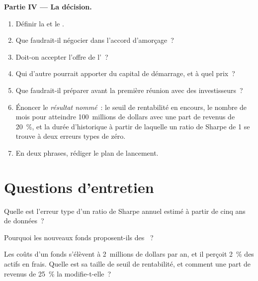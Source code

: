 \begin{problem}
\medskip\noindent\textbf{Partie IV --- La décision.}
\begin{enumerate}[resume]
\item Définir la  et le .
\item Que faudrait-il négocier dans l'accord d'amorçage~?
\item Doit-on accepter l'offre de l'~?
\item Qui d'autre pourrait apporter du capital de démarrage, et à quel prix~?
\item Que faudrait-il préparer avant la première réunion avec des investisseurs~?
\item Énoncer le \emph{résultat nommé}~: le seuil de rentabilité en encours, le nombre de mois pour atteindre 100~millions de dollars avec une part de revenus de 20~\%, et la
durée d'historique à partir de laquelle un ratio de Sharpe de 1 se trouve à deux erreurs types de zéro.
\item En deux phrases, rédiger le plan de lancement.
\end{enumerate}
\end{problem}

\section{Questions d'entretien}

\begin{interviewq}\label{iq:fm:launching-a-fund-and-raising-capital:1}
Quelle est l'erreur type d'un ratio de Sharpe annuel estimé à partir de cinq ans de données~?
\end{interviewq}

\begin{interviewq}\label{iq:fm:launching-a-fund-and-raising-capital:2}
Pourquoi les nouveaux fonds proposent-ils des ~?
\end{interviewq}

\begin{interviewq}\label{iq:fm:launching-a-fund-and-raising-capital:3}
Les coûts d'un fonds s'élèvent à 2~millions de dollars par an, et il perçoit 2~\% des actifs en frais. Quelle est sa taille de seuil de rentabilité, et comment une part de revenus de 25~\% la modifie-t-elle~?
\end{interviewq}

